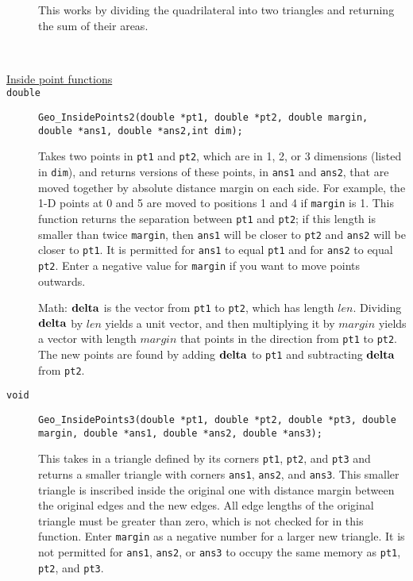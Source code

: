 \documentclass[11pt]{article}
\newcommand {\ttt} {\texttt}
\begin{document}
\begin{description}
This works by dividing the quadrilateral into two triangles and returning the sum of their areas.

\hfill \\
\item[\underline{Inside point functions}]

\item[\ttt{double}]
\ttt{Geo\_InsidePoints2(double *pt1, double *pt2, double margin, double *ans1, double *ans2,int dim);}

Takes two points in \ttt{pt1} and \ttt{pt2}, which are in 1, 2, or 3 dimensions (listed in \ttt{dim}), and returns versions of these points, in \ttt{ans1} and \ttt{ans2}, that are moved together by absolute distance margin on each side. For example, the 1-D points at 0 and 5 are moved to positions 1 and 4 if \ttt{margin} is 1. This function returns the separation between \ttt{pt1} and \ttt{pt2}; if this length is smaller than twice \ttt{margin}, then \ttt{ans1} will be closer to \ttt{pt2} and \ttt{ans2} will be closer to \ttt{pt1}. It is permitted for \ttt{ans1} to equal \ttt{pt1} and for \ttt{ans2} to equal \ttt{pt2}. Enter a negative value for \ttt{margin} if you want to move points outwards.

Math: $\vb{delta}$ is the vector from \ttt{pt1} to \ttt{pt2}, which has length $len$. Dividing $\vb{delta}$ by $len$ yields a unit vector, and then multiplying it by $margin$ yields a vector with length $margin$ that points in the direction from \ttt{pt1} to \ttt{pt2}. The new points are found by adding $\bf{delta}$ to \ttt{pt1} and subtracting $\vb{delta}$ from \ttt{pt2}.

\item[\ttt{void}]
\ttt{Geo\_InsidePoints3(double *pt1, double *pt2, double *pt3, double margin, double *ans1, double *ans2, double *ans3);}

This takes in a triangle defined by its corners \ttt{pt1}, \ttt{pt2}, and \ttt{pt3} and returns a smaller triangle with corners \ttt{ans1}, \ttt{ans2}, and \ttt{ans3}. This smaller triangle is inscribed inside the original one with distance margin between the original edges and the new edges. All edge lengths of the original triangle must be greater than zero, which is not checked for in this function. Enter \ttt{margin} as a negative number for a larger new triangle. It is not permitted for \ttt{ans1}, \ttt{ans2}, or \ttt{ans3} to occupy the same memory as \ttt{pt1}, \ttt{pt2}, and \ttt{pt3}.


\end{description}
\end{document}
